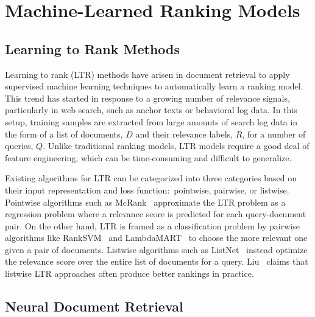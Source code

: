 \section{Machine-Learned Ranking Models}


\subsection{Learning to Rank Methods}

Learning to rank (LTR) methods have arisen in document retrieval to apply supervised machine learning techniques to automatically learn a ranking model.
This trend has started in response to a growing number of relevance signals, particularly in web search, such as anchor texts or behavioral log data.
In this setup, training samples are extracted from large amounts of search log data in the form of a list of documents, $ D $ and their relevance labels, $ R $, for a number of queries, $ Q $.
Unlike traditional ranking models, LTR models require a good deal of feature engineering, which can be time-consuming and difficult to generalize.

Existing algorithms for LTR can be categorized into three categories based on their input representation and loss function:\ pointwise, pairwise, or listwise.~\cite{liu2011learning}
Pointwise algorithms such as McRank~\cite{li2008mcrank} approximate the LTR problem as a regression problem where a relevance score is predicted for each query-document pair.
On the other hand, LTR is framed as a classification problem by pairwise algorithms like RankSVM~\cite{joachims2002optimizing} and LambdaMART~\cite{burges2010ranknet} to choose the more relevant one given a pair of documents.
Listwise algorithms such as ListNet~\cite{cao2007learning} instead optimize the relevance score over the entire list of documents for a query.
Liu~\cite{liu2011learning} claims that listwise LTR approaches often produce better rankings in practice.

\subsection{Neural Document Retrieval}
\label{neural-retrieval}

